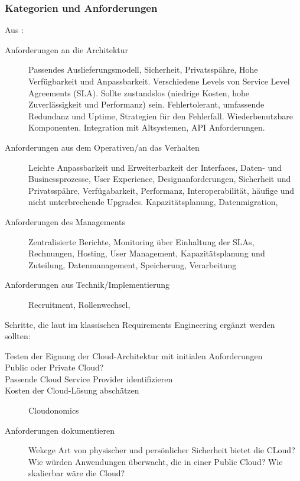 \subsubsection{Kategorien und Anforderungen}
Aus :
\begin{description}
	\item[Anforderungen an die Architektur] Passendes Auslieferungsmodell, 
Sicherheit, Privatsspähre, Hohe Verfügbarkeit und Anpassbarkeit. Verschiedene 
Levels von Service Level Agreements (SLA). Sollte zustandslos (niedrige Kosten, 
hohe Zuverlässigkeit und Performanz) sein. Fehlertolerant, umfassende 
Redundanz und Uptime, Strategien für den Fehlerfall. Wiederbenutzbare 
Komponenten. Integration mit Altsystemen, API Anforderungen. 
	\item[Anforderungen aus dem Operativen/an das Verhalten] Leichte 
Anpassbarkeit und Erweiterbarkeit der Interfaces, Daten- und Businessprozesse, 
User Experience, Designanforderungen, Sicherheit und Privatsspähre, 
Verfügabarkeit, Performanz, Interoperabilität, häufige und nicht unterbrechende 
Upgrades. Kapazitätsplanung, Datenmigration, 
	\item[Anforderungen des Managements] Zentralisierte Berichte, 
Monitoring über Einhaltung der SLAs, Rechnungen, Hosting, User Management, 
Kapazitätsplanung und Zuteilung, Datenmanagement, Speicherung, Verarbeitung
	\item[Anforderungen aus Technik/Implementierung] Recruitment, 
Rollenwechsel, 
\end{description}

Schritte, die laut 
 im klassischen 
Requirements Engineering ergänzt werden sollten:
\begin{description}
	\item[Testen der Eignung der Cloud-Architektur mit initialen 
Anforderungen]
	\item[Public oder Private Cloud?]
	\item[Passende Cloud Service Provider identifizieren]
	\item[Kosten der Cloud-Lösung abschätzen] Cloudonomics
	\item[Anforderungen dokumentieren] Wekcge Art von physischer und 
persönlicher Sicherheit bietet die CLoud? Wie würden Anwendungen überwacht, die 
in einer Public Cloud? Wie skalierbar wäre die Cloud?
\end{description}



